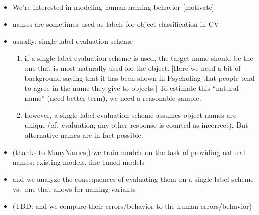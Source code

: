 \begin{itemize}
\item We're interested in modeling human naming behavior [motivate]
\item names are sometimes used as labels for object classification in CV
\item usually: single-label evaluation scheme
  \begin{enumerate}
  \item if a single-label evaluation scheme is used, the target name should be the one that is most naturally used for the object. [Here we need a bit of background saying that it has been shown in Psycholing that people tend to agree in the name they give to objects.] To estimate this ``natural name'' (need better term), we need a reasonable sample.
  \item however, a single-label evaluation scheme assumes object names are unique (cf.\ evaluation; any other response is counted as incorrect). But alternative names are in fact possible.
  \end{enumerate}
\item (thanks to ManyNames,) we train models on the task of providing natural names; existing models, fine-tuned models 
\item and we analyze the consequences of evaluating them on a single-label scheme vs.\ one that allows for naming variants
\item (TBD: and we compare their errors/behavior to the human errors/behavior)
\end{itemize}

